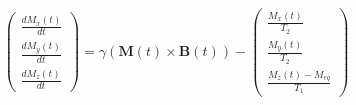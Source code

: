 \documentclass[border=2pt,varwidth]{standalone}
\begin{document}
\[
  \begin{pmatrix}
    \frac{d M_x (t)}{d t} \\
    \frac{d M_y (t)}{d t} \\
    \frac{d M_z (t)}{d t}
  \end{pmatrix} =
  \gamma ( \mathbf{M}(t) \times \mathbf{B}(t) ) -
  \begin{pmatrix}
    \frac{M_x (t)}{T_2} \\
    \frac{M_y (t)}{T_2} \\
    \frac{M_z (t) - M_{eq}}{T_1}
  \end{pmatrix}
\]
\end{document}
